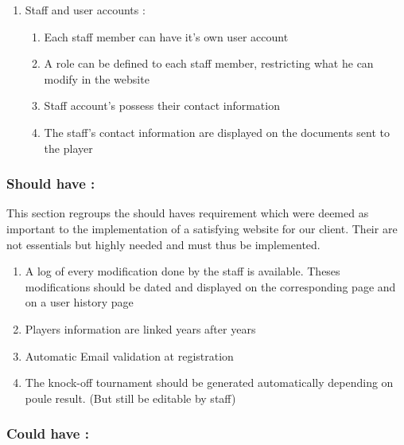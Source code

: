 \begin{enumerate}
\begin{enumerate}
{ handed to the players}
\item \textcolor{green!60!black} {A specific page indicate results at the end 
of the day}
\end{enumerate}
\item Staff and user accounts : \newline
\begin{enumerate} \itemsep1pt
\item \textcolor{green!60!black} {Each staff member can have it's own user account}
\item \textcolor{green!60!black} {A role can be defined to each staff member, 
restricting what he can modify in the website}
\item \textcolor{green!60!black} {Staff account's possess their contact information}
\item \textcolor{green!60!black} {The staff's contact information are displayed 
on the documents sent to the player}
\end{enumerate}
\end{enumerate}

\subsubsection{Should have :}
\label{Should have}

This section regroups the should haves requirement which were deemed as important
to the implementation of a satisfying website for our client. Their are not essentials
but highly needed and must thus be implemented. \newline

\begin{enumerate} \itemsep1pt
\item \textcolor{green!60!black} {A log of every modification done by the staff 
is available. Theses modifications should be dated and displayed on the 
corresponding page and on a user history page}
\item \textcolor{green!60!black} {Players information are linked years after years}
\item \textcolor{green!60!black} {Automatic Email validation at registration}
\item \textcolor{green!60!black} {The knock-off tournament should be generated 
automatically depending on poule result. (But still be editable by staff)}
\end{enumerate}

\subsubsection{Could have :}
\label{Could have}

